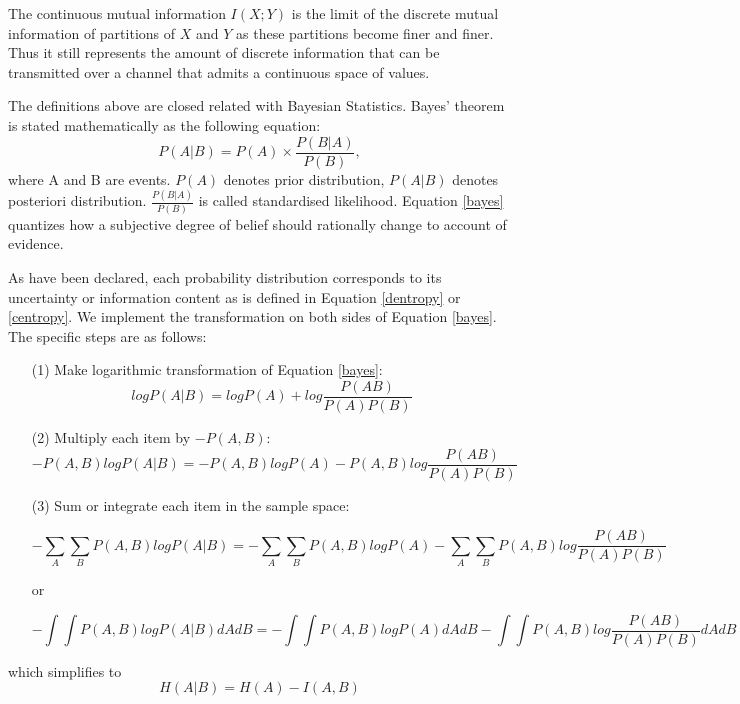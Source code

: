 \documentclass[draft,wrr]{AGUTeX}
\begin{document}
\begin{article}
The continuous mutual information $I(X;Y)$ is the limit of the discrete mutual information of partitions of $X$ and $Y$ as these partitions become finer and finer. Thus it  still represents the amount of discrete information that can be transmitted over a channel that admits a continuous space of values.

The definitions above are closed related with Bayesian Statistics. Bayes' theorem is stated mathematically as the following equation:
\begin{equation}
\label{bayes}
P(A|B) = P(A)\times \frac{P(B | A)}{P(B)},
\end{equation}
where A and B are events.
$P(A)$ denotes prior distribution, $P(A|B)$ denotes posteriori distribution. $\frac{P(B | A)}{P(B)}$ is called standardised likelihood. 
Equation \eqref{bayes} quantizes how a subjective degree of belief should rationally change to account of evidence. 

As have been declared, each probability distribution corresponds to its uncertainty or information content as is defined in Equation \eqref{dentropy}  or  \eqref{centropy}. We implement the transformation on both sides of Equation \eqref{bayes}. The specific steps are as follows:
\begin{itemize}
\item[(1)] Make logarithmic transformation of Equation \ref{bayes}:
\begin{equation}
\label{log}
logP(A|B) =logP(A)+log \frac{P (AB)}{P(A)P(B)} 
\end{equation}
\item[(2)] Multiply each item by $-P(A,B)$:
\begin{equation}
\label{element}
-P(A,B)logP(A|B) =-P(A,B) logP(A)-P(A,B) log \frac{P (AB)}{P(A)P(B)} 
\end{equation} 
\item[(3)] Sum or integrate each item in the sample space:
\begin{small}
\begin{equation}
\label{element1}
-\sum_{A} \sum_{B} P(A,B)logP(A|B) =-\sum_{A} \sum_{B} P(A,B) logP(A)-\sum_{A} \sum_{B} P(A,B) log \frac{P (AB)}{P(A)P(B)} 
\end{equation} 
\end{small}
or
\begin{small}
\begin{equation}
\label{element2}
-\int\int P(A,B)logP(A|B)dAdB =-\int \int P(A,B)logP(A)dAdB -\int \int P(A,B)log \frac{P (AB)}{P(A)P(B)}dAdB
\end{equation}
\end{small}
\end{itemize}
which simplifies to  
\begin{equation}
\label{bayesuncertainty}
H(A|B) = H(A)-I(A,B)
\end{equation}


\end{article}
\end{document}
